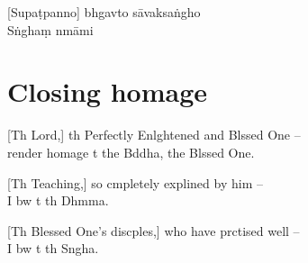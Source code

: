 
[Supaṭpanno] bhgavto sāvaksaṅgho\\
Sṅghaṃ nmāmi


\chapter{Closing homage}

[Th Lord,] th Perfectly Enlghtened and Blssed One --\\
 render homage t the Bddha, the Blssed One.


[Th Teaching,] so cmpletely explined by him --\\
I bw t th Dhmma.


[Th Blessed One's discples,] who have prctised well --\\
I bw t th Sngha.


